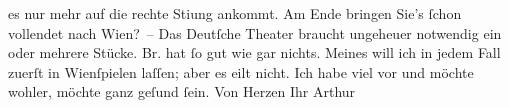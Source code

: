 \begin{ledgroupsized}[t]{13cm}
                    es nur mehr auf die rechte Sti{\geminationm}ung ankommt. Am Ende
                    bringen Sie’s ſchon vollendet nach Wien? –\pend
           \pstart
           Das Deutſche Theater braucht ungeheuer notwendig
                    ein oder mehrere Stücke. Br. hat ſo gut wie
                    gar nichts. Meines will ich in jedem Fall zuerſt in Wienſpielen laſſen; aber es eilt nicht. Ich habe viel vor und möchte
                    wohler, möchte ganz geſund ſein.\pend
           \pstart Von Herzen Ihr \spacefill\mbox{Arthur}\pend{}
         
         \endnumbering{}\end{ledgroupsized}  \newcommand{\dateiname}{L00990}\newcommand{\titel}{Arthur Schnitzler an Hugo von Hofmannsthal, 8. 10. 1899}\newcommand{\editorInnen}{ Martin Anton Müller und Gerd-Hermann Susen}
      